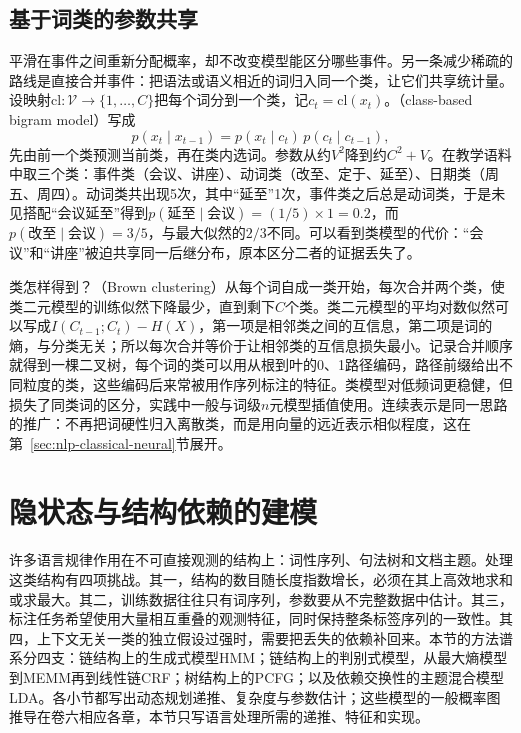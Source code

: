 \subsection{基于词类的参数共享}
\label{sec:nlp-classical-class-models}

平滑在事件之间重新分配概率，却不改变模型能区分哪些事件。另一条减少稀疏的路线是直接合并事件：把语法或语义相近的词归入同一个类，让它们共享统计量。设映射$\mathrm{cl}:\mathcal V\to\{1,\ldots,C\}$把每个词分到一个类，记$c_t=\mathrm{cl}(x_t)$。（class-based bigram model）写成
\begin{equation}
  p(x_t\mid x_{t-1})=p(x_t\mid c_t)\,p(c_t\mid c_{t-1}),
  \label{eq:nlp-classical-class-bigram}
\end{equation}
先由前一个类预测当前类，再在类内选词。参数从约$V^2$降到约$C^2+V$。在教学语料中取三个类：事件类（会议、讲座）、动词类（改至、定于、延至）、日期类（周五、周四）。动词类共出现5次，其中“延至”1次，事件类之后总是动词类，于是未见搭配“会议延至”得到$p(\text{延至}\mid\text{会议})=(1/5)\times1=0.2$，而$p(\text{改至}\mid\text{会议})=3/5$，与最大似然的$2/3$不同。可以看到类模型的代价：“会议”和“讲座”被迫共享同一后继分布，原本区分二者的证据丢失了。

类怎样得到？（Brown clustering）从每个词自成一类开始，每次合并两个类，使类二元模型的训练似然下降最少，直到剩下$C$个类。类二元模型的平均对数似然可以写成$I(C_{t-1};C_t)-H(X)$，第一项是相邻类之间的互信息，第二项是词的熵，与分类无关；所以每次合并等价于让相邻类的互信息损失最小。记录合并顺序就得到一棵二叉树，每个词的类可以用从根到叶的0、1路径编码，路径前缀给出不同粒度的类，这些编码后来常被用作序列标注的特征。类模型对低频词更稳健，但损失了同类词的区分，实践中一般与词级$n$元模型插值使用。连续表示是同一思路的推广：不再把词硬性归入离散类，而是用向量的远近表示相似程度，这在第~\ref{sec:nlp-classical-neural}节展开。

\section{隐状态与结构依赖的建模}
\label{sec:nlp-classical-structures}

许多语言规律作用在不可直接观测的结构上：词性序列、句法树和文档主题。处理这类结构有四项挑战。其一，结构的数目随长度指数增长，必须在其上高效地求和或求最大。其二，训练数据往往只有词序列，参数要从不完整数据中估计。其三，标注任务希望使用大量相互重叠的观测特征，同时保持整条标签序列的一致性。其四，上下文无关一类的独立假设过强时，需要把丢失的依赖补回来。本节的方法谱系分四支：链结构上的生成式模型HMM；链结构上的判别式模型，从最大熵模型到MEMM再到线性链CRF；树结构上的PCFG；以及依赖交换性的主题混合模型LDA。各小节都写出动态规划递推、复杂度与参数估计；这些模型的一般概率图推导在卷六相应各章，本节只写语言处理所需的递推、特征和实现。


